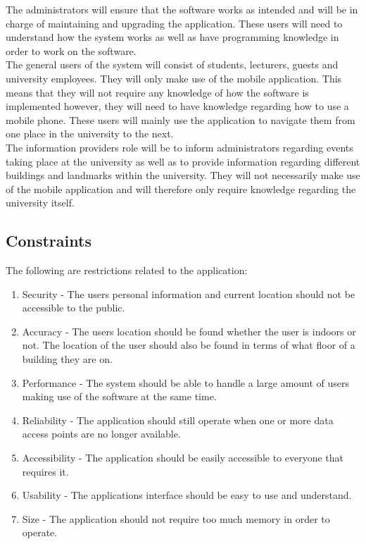 \documentclass[12pt,a4paper]{report}
\begin{document}
		
	The administrators will ensure that the software works as intended and will be in charge of maintaining and upgrading the application. These users will need to understand how the system works as well as have programming knowledge in order to work on the software.  
	\\

	The general users of the system will consist of students, lecturers, guests and university employees. They will only make use of the mobile application. This means that they will not require any knowledge of how the software is implemented however, they will need to have knowledge regarding how to use a mobile phone. These users will mainly use the application to navigate them from one place in the university to the next.
	\\

	The information providers role will be to inform administrators regarding events taking place at the university as well as to provide information regarding different buildings and landmarks within the university. They will not necessarily make use of the mobile application and will therefore only require knowledge regarding the university itself.
	
	\subsection*{Constraints}
	The following are restrictions related to the application:
		\begin{enumerate}
				\renewcommand{\labelenumi}{{\textbf{\arabic{enumi}.}}}
				\item Security  - The users personal information and current location should not be accessible to the public.
				\item Accuracy - The users location should be found whether the user is indoors or not. The location of the user should also be found in terms of what floor of a building they are on.
				\item Performance - The system should be able to handle a large amount of users making use of the software at the same time.
				\item Reliability - The application should still operate when one or more data access points are no longer available.
				\item Accessibility - The application should be easily accessible to everyone that requires it.
				\item Usability - The applications interface should be easy to use and understand.
				\item Size - The application should not require too much memory in order to operate.
				\end{enumerate}
\end{document}
